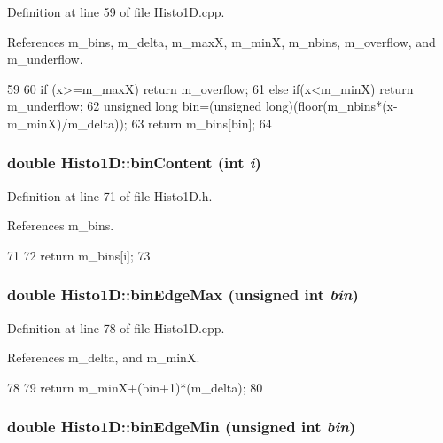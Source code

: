 Definition at line 59 of file Histo1D.cpp.

References m\_\-bins, m\_\-delta, m\_\-maxX, m\_\-minX, m\_\-nbins, m\_\-overflow, and m\_\-underflow.


\begin{DoxyCode}
59                            {
60     if (x>=m_maxX) {return m_overflow;}
61     else if(x<m_minX) {return m_underflow;}
62     unsigned long bin=(unsigned long)(floor(m_nbins*(x-m_minX)/m_delta));
63     return m_bins[bin];
64 }   
\end{DoxyCode}
\hypertarget{classHisto1D_aece5cb8dddafabe0029067dc3e4be878}{
\subsubsection[{binContent}]{\setlength{\rightskip}{0pt plus 5cm}double Histo1D::binContent (int {\em i})}}
\label{classHisto1D_aece5cb8dddafabe0029067dc3e4be878}


Definition at line 71 of file Histo1D.h.

References m\_\-bins.


\begin{DoxyCode}
71                           {
72     return m_bins[i];
73   }
\end{DoxyCode}
\hypertarget{classHisto1D_a7923d51b02056dbaef353b70c11499d0}{
\subsubsection[{binEdgeMax}]{\setlength{\rightskip}{0pt plus 5cm}double Histo1D::binEdgeMax (unsigned int {\em bin})}}
\label{classHisto1D_a7923d51b02056dbaef353b70c11499d0}


Definition at line 78 of file Histo1D.cpp.

References m\_\-delta, and m\_\-minX.


\begin{DoxyCode}
78                                              {
79   return m_minX+(bin+1)*(m_delta);
80 }
\end{DoxyCode}
\hypertarget{classHisto1D_aa15ab79f858358e3cafc0617eb668c2e}{
\subsubsection[{binEdgeMin}]{\setlength{\rightskip}{0pt plus 5cm}double Histo1D::binEdgeMin (unsigned int {\em bin})}}
\label{classHisto1D_aa15ab79f858358e3cafc0617eb668c2e}


